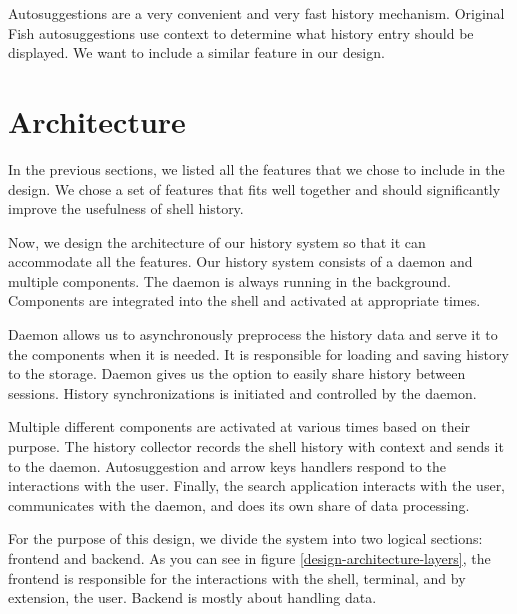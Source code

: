 
Autosuggestions are a very convenient and very fast history mechanism. Original Fish autosuggestions use context to determine what history entry should be displayed.
We want to include a similar feature in our design.

\newpage
\section{Architecture}

In the previous sections, we listed all the features that we chose to include in the design. We chose a set of features that fits well together and should significantly improve the usefulness of shell history.

Now, we design the architecture of our history system so that it can accommodate all the features. 
Our history system consists of a daemon and multiple components. The daemon is always running in the background. Components are integrated into the shell and activated at appropriate times. 


Daemon allows us to asynchronously preprocess the history data and serve it to the components when it is needed. It is responsible for loading and saving history to the storage. Daemon gives us the option to easily share history between sessions. History synchronizations is initiated and controlled by the daemon.


Multiple different components are activated at various times based on their purpose. The history collector records the shell history with context and sends it to the daemon. Autosuggestion and arrow keys handlers respond to the interactions with the user. Finally, the search application interacts with the user, communicates with the daemon, and does its own share of data processing.


For the purpose of this design, we divide the system into two logical sections: frontend and backend. As you can see in figure \ref{design-architecture-layers}, the frontend is responsible for the interactions with the shell, terminal, and by extension, the user. Backend is mostly about handling data. 

